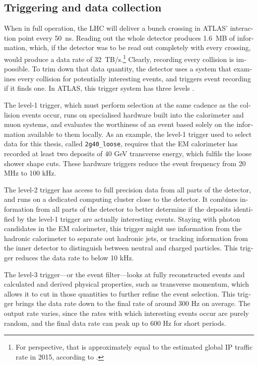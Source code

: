 \begin{english}
\subsection{Triggering and data collection}
When in full operation, the LHC will deliver a bunch crossing in ATLAS' interaction point every 50~ns. Reading out the whole detector produces 1.6~MB of information, which, if the detector was to be read out completely with every crossing, would produce a data rate of 32~TB/s.\footnote{For perspective, that is approximately equal to the estimated global IP traffic rate in 2015, according to \cite{wolframip}.} Clearly, recording every collision is impossible. To trim down that data quantity, the detector uses a system that examines every collision for potentially interesting events, and triggers event recording if it finds one. In ATLAS, this trigger system has three levels \cite{detectorpaper}.

The level-1 trigger, which must perform selection at the same cadence as the collision events occur, runs on specialised hardware built into the calorimeter and muon systems, and evaluates the worthiness of an event based solely on the information available to them locally. As an example, the level-1 trigger used to select data for this thesis, called \texttt{2g40\_loose}, requires that the EM calorimeter has recorded at least two deposits of 40 GeV transverse energy, which fulfils the loose shower shape cuts. These hardware triggers reduce the event frequency from 20 MHz to 100 kHz.

The level-2 trigger has access to full precision data from all parts of the detector, and runs on a dedicated computing cluster close to the detector. It combines information from all parts of the detector to better determine if the deposits identified by the level-1 trigger are actually interesting events. Staying with photon candidates in the EM calorimeter, this trigger might use information from the hadronic calorimeter to separate out hadronic jets, or tracking information from the inner detector to distinguish between neutral and charged particles. This trigger reduces the data rate to below 10 kHz.

The level-3 trigger---or the event filter---looks at fully reconstructed events and calculated and derived physical properties, such as transverse momentum, which allows it to cut in those quantities to further refine the event selection. This trigger brings the data rate down to the final rate of around 300 Hz on average. The output rate varies, since the rates with which interesting events occur are purely random, and the final data rate can peak up to 600 Hz for short periods.


\end{english}
